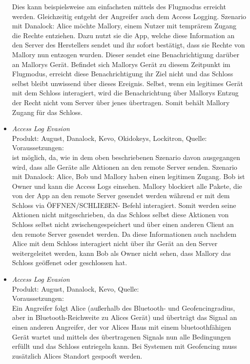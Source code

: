 \begin{itemize}[leftmargin=0cm,label={}]
            Dies kann beispielsweise am einfachsten mittels des Flugmodus erreicht werden.
            Gleichzeitig entgeht der Angreifer auch dem Access Logging.
            Szenario mit Danalock: Alice möchte Mallory, einem Nutzer mit temprärem Zugang die Rechte entziehen. 
            Dazu nutzt sie die App, welche diese Information an den Server des Herstellers sendet und ihr sofort bestätigt, dass sie Rechte von Mallory nun entzogen wurden. 
            Dieser sendet eine Benachrichtigung darüber an Mallorys Gerät. 
            Befindet sich Mallorys Gerät zu diesem Zeitpunkt im Flugmodus, erreicht diese Benachrichtigung ihr Ziel nicht und das Schloss selbst bleibt unwissend über dieses Ereignis. 
            Selbst, wenn ein legitimes Gerät mit dem Schloss interagiert, wird die Benachrichtung über Mallorys Entzug der Recht nicht vom Server über jenes übertragen.
            Somit behält Mallory Zugang für das Schloss.
        \item \emph{Access Log Evasion}\\
            Produkt: August, Danalock, Kevo, Okidokeys, Lockitron, Quelle: \cite{Ho2016}\\
            Voraussetzungen: \\
            ist möglich, da, wie in dem oben beschriebenen Szenario davon ausgegangen wird, dass alle Geräte alle Aktionen an den remote Server senden.
            Szenario mit Danalock: Alice, Bob und Mallory haben einen legitimen Zugang.
            Bob ist Owner und kann die Access Logs einsehen.
            Mallory blockiert alle Pakete, die von der App an den remote Server gesendet werden während er mit dem Schloss via ÖFFNEN/\-SCHLIEßEN- Befehl interagiert.
            Somit werden seine Aktionen nicht mitgeschrieben, da das Schloss selbst diese Aktionen von Schloss selbst nicht zwischengespeichert und über einen anderen Client an den remote Server gesendet werden.
            Da diese Informationen auch nachdem Alice mit dem Schloss interagiert nicht über ihr Gerät an den Server weitergeleitet werden, kann Bob als Owner nicht sehen, dass Mallory das Schloss geöffenet oder geschlossen hat.
        \item \emph{Access Log Evasion}\\
            Produkt: August, Danalock, Kevo, Quelle: \cite{Ho2016}\\
            Voraussetzungen: \\
            Ein Angreifer folgt Alice (außerhalb des Bluetooth- und Geofencingradius, aber in Bluetooth-Reichweite zu Alices Gerät) und überträgt das Signal an einen anderen Angreifer, der vor Alices Haus mit einem bluetoothfähigen Gerät wartet und mittels des übertragenen Signals nun alle Bedingungen erfüllt und das Schloss entriegeln kann.
        Bei Systemen mit Geofencing muss zusätzlich Alices Standort gespooft werden.
    \end{itemize}
	

